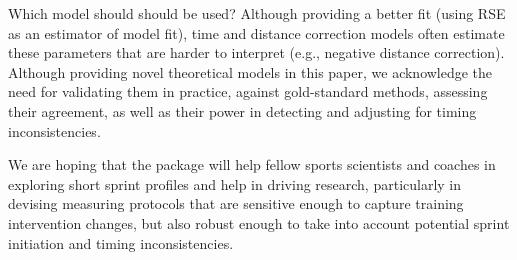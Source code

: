 \documentclass[
]{jss}
\begin{document}
Which model should should be used? Although providing a better fit (using RSE as an estimator of model fit), time and distance correction models often estimate these parameters that are harder to interpret (e.g., negative distance correction). Although providing novel theoretical models in this paper, we acknowledge the need for validating them in practice, against gold-standard methods, assessing their agreement, as well as their power in detecting and adjusting for timing inconsistencies.

We are hoping that the  package will help fellow sports scientists and coaches in exploring short sprint profiles and help in driving research, particularly in devising measuring protocols that are sensitive enough to capture training intervention changes, but also robust enough to take into account potential sprint initiation and timing inconsistencies.

\renewcommand\refname{References}

\end{document}
